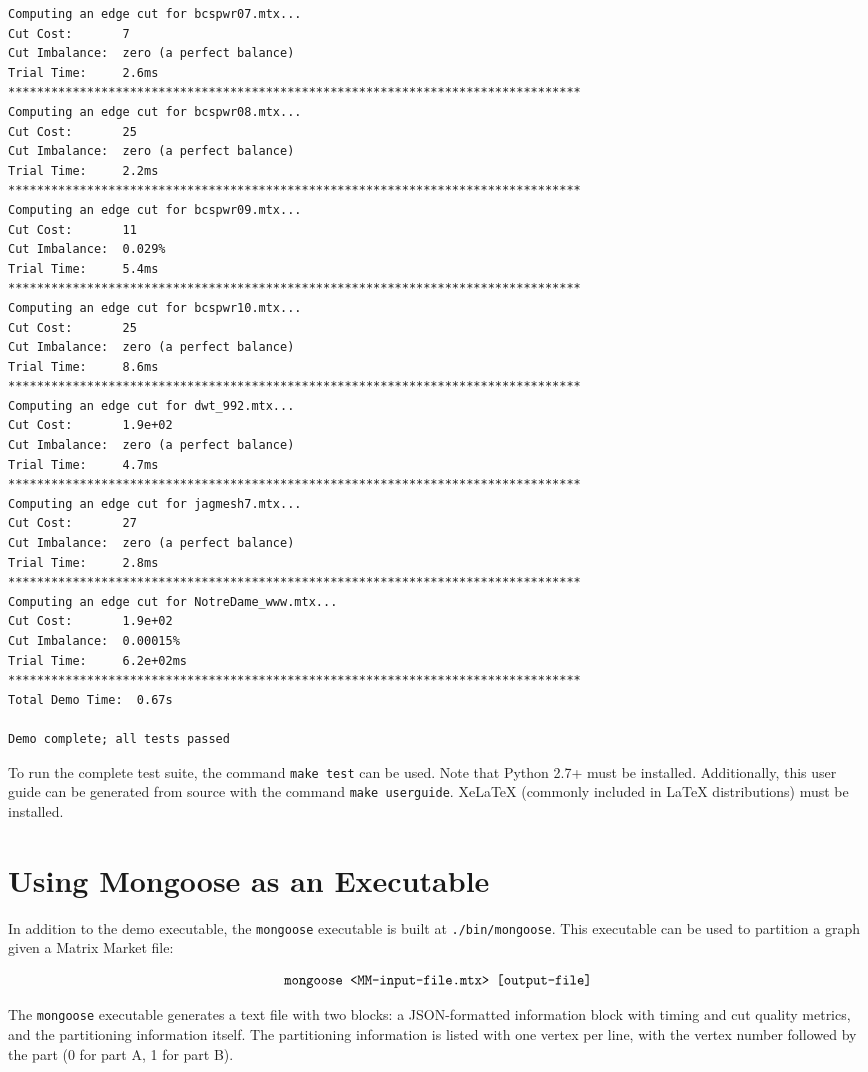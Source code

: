 \documentclass[letter]{article}
\begin{document}
\begin{lstlisting}[numbers=none,xleftmargin=.09\textwidth, xrightmargin=.09\textwidth,keywordstyle=\color{black}]
Computing an edge cut for bcspwr07.mtx...
Cut Cost:       7
Cut Imbalance:  zero (a perfect balance)
Trial Time:     2.6ms
********************************************************************************
Computing an edge cut for bcspwr08.mtx...
Cut Cost:       25
Cut Imbalance:  zero (a perfect balance)
Trial Time:     2.2ms
********************************************************************************
Computing an edge cut for bcspwr09.mtx...
Cut Cost:       11
Cut Imbalance:  0.029%
Trial Time:     5.4ms
********************************************************************************
Computing an edge cut for bcspwr10.mtx...
Cut Cost:       25
Cut Imbalance:  zero (a perfect balance)
Trial Time:     8.6ms
********************************************************************************
Computing an edge cut for dwt_992.mtx...
Cut Cost:       1.9e+02
Cut Imbalance:  zero (a perfect balance)
Trial Time:     4.7ms
********************************************************************************
Computing an edge cut for jagmesh7.mtx...
Cut Cost:       27
Cut Imbalance:  zero (a perfect balance)
Trial Time:     2.8ms
********************************************************************************
Computing an edge cut for NotreDame_www.mtx...
Cut Cost:       1.9e+02
Cut Imbalance:  0.00015%
Trial Time:     6.2e+02ms
********************************************************************************
Total Demo Time:  0.67s

Demo complete; all tests passed
\end{lstlisting}

To run the complete test suite, the command \texttt{make test} can be used. Note that Python 2.7+ must be installed. Additionally, this user guide can be generated from source with the command \texttt{make userguide}. XeLaTeX (commonly included in LaTeX distributions) must be installed.

\section{Using Mongoose as an Executable}

In addition to the demo executable, the \texttt{mongoose} executable is built at \texttt{./bin/mongoose}. This executable can be used to partition a graph given a Matrix Market file:

\[\text{\texttt{mongoose <MM-input-file.mtx> [output-file]}}\]

The \texttt{mongoose} executable generates a text file with two blocks: a JSON-formatted information block with timing and cut quality metrics, and the partitioning information itself. The partitioning information is listed with one vertex per line, with the vertex number followed by the part (0 for part A, 1 for part B).\\
\end{document}
